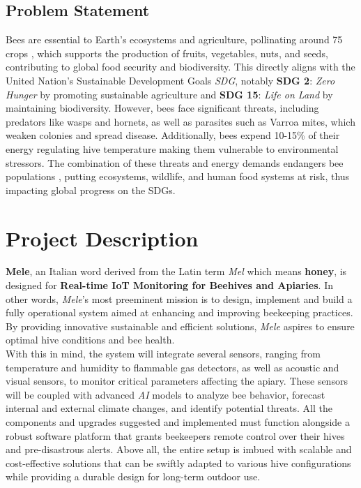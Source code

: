 \documentclass[12pt]{article}
\begin{document}
	\subsection{Problem Statement}
	Bees are essential to Earth's ecosystems and agriculture, pollinating around 75%
	crops \cite{honeypercent}, which supports the production of fruits, vegetables, nuts, and seeds, contributing to global food 
	security and biodiversity. This directly aligns with the United Nation's Sustainable Development Goals \textit{SDG}, notably  \textbf{SDG 2}: \textit{Zero Hunger} \cite{feketene2023evaluation} by promoting sustainable
	agriculture and \textbf{SDG 15}: \textit{Life on Land} \cite{levenson2022pollinator} by maintaining biodiversity. However, bees face significant
	threats, including predators like wasps and hornets, as well as parasites such as Varroa mites, which weaken
	colonies and spread disease. Additionally, bees expend 10-15\% of their energy regulating hive temperature 
	making them vulnerable to environmental stressors. The combination of these threats and energy demands
	endangers bee populations \cite{weinberg2023organizational}, putting ecosystems, wildlife, and human food systems at risk, thus impacting global
	progress on the SDGs.
	\section{Project Description}
	\textbf{Mele}, an Italian word derived from the Latin term \textit{Mel} which means \textbf{honey}, is designed for \textbf{Real-time IoT Monitoring for Beehives and Apiaries}. In other words, \textit{Mele}'s most preeminent mission is to design, implement and build a fully operational system aimed at enhancing and improving beekeeping practices. By providing innovative sustainable and efficient solutions, \textit{Mele} aspires to ensure optimal hive conditions and bee health. \\ \newline
	With this in mind, the system will integrate several sensors, ranging from temperature and humidity to flammable gas detectors, as well as acoustic and visual sensors, to monitor critical parameters affecting the apiary. These sensors will be coupled with advanced \textit{AI} models to analyze bee behavior, forecast internal and external climate changes, and identify potential threats.
	\newpage
	\hspace{-0.78 cm} All the components and upgrades suggested and implemented must function alongside a robust software platform that grants beekeepers remote control over their hives and pre-disastrous alerts. Above all, the entire setup is imbued with scalable and cost-effective solutions that can be swiftly adapted to various hive configurations while providing a durable design for long-term outdoor use.
	\vspace{0.5 cm}
\end{document}
